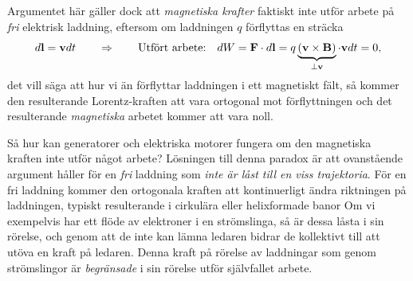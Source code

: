 Argumentet h{\"a}r g{\"a}ller dock att {\it magnetiska krafter} faktiskt inte
utf{\"o}r arbete p{\aa} {\it fri} elektrisk laddning, eftersom om laddningen
$q$ f{\"o}rflyttas en str{\"a}cka
\hl{$$
  d{\bf l}={\bf v}dt
  \qquad\Rightarrow\qquad\hbox{Utf{\"o}rt arbete:}\quad
  dW={\bf F}\cdot d{\bf l}
    =q\underbrace{({\bf v}\times{\bf B})}_{\perp{\bf v}}\cdot{\bf v}dt
    =0,
$$}
det vill s{\"a}ga att hur vi {\"a}n f{\"o}rflyttar laddningen i ett magnetiskt
f{\"a}lt, s{\aa} kommer den resulterande Lorentz-kraften att vara ortogonal mot
f{\"o}rflyttningen och det resulterande {\it magnetiska} arbetet kommer att
vara noll.

S{\aa} hur kan generatorer och elektriska motorer fungera om den magnetiska
kraften inte utf{\"o}r n{\aa}got arbete? L{\"o}sningen till denna paradox
{\"a}r att ovanst{\aa}ende argument h{\aa}ller f{\"o}r en {\it fri} laddning
som {\it inte {\"a}r l{\aa}st till en viss trajektoria}.
F{\"o}r en fri laddning kommer den ortogonala kraften att kontinuerligt
{\"a}ndra riktningen p{\aa} laddningen, typiskt resulterande i cirkul{\"a}ra
eller helixformade banor
Om vi exempelvis har ett fl{\"o}de av elektroner i en str{\"o}mslinga, s{\aa}
{\"a}r dessa l{\aa}sta i sin r{\"o}relse, och genom att de inte kan l{\"a}mna
ledaren bidrar de kollektivt till att ut{\"o}va en kraft p{\aa} ledaren.
Denna kraft p{\aa} r{\"o}relse av laddningar som genom str{\"o}mslingor {\"a}r
{\it begr{\"a}nsade} i sin r{\"o}relse utf{\"o}r sj{\"a}lvfallet arbete.

